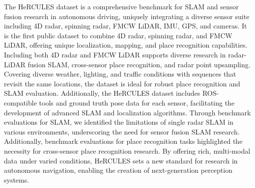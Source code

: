 The HeRCULES dataset is a comprehensive benchmark for \ac{SLAM} and sensor fusion research in autonomous driving, uniquely integrating a diverse sensor suite including 4D radar, spinning radar, \ac{FMCW} \ac{LiDAR}, \ac{IMU}, \ac{GPS}, and cameras. It is the first public dataset to combine 4D radar, spinning radar, and \ac{FMCW} \ac{LiDAR}, offering unique localization, mapping, and place recognition capabilities. Including both 4D radar and \ac{FMCW} \ac{LiDAR} supports diverse research in radar-\ac{LiDAR} fusion \ac{SLAM}, cross-sensor place recognition, and radar point upsampling. Covering diverse weather, lighting, and traffic conditions with sequences that revisit the same locations, the dataset is ideal for robust place recognition and \ac{SLAM} evaluation. Additionally, the HeRCULES dataset includes \ac{ROS}-compatible tools and ground truth pose data for each sensor, facilitating the development of advanced \ac{SLAM} and localization algorithms. Through benchmark evaluations for \ac{SLAM}, we identified the limitations of single radar \ac{SLAM} in various environments, underscoring the need for sensor fusion SLAM research. Additionally, benchmark evaluations for place recognition tasks highlighted the necessity for cross-sensor place recognition research. By offering rich, multi-modal data under varied conditions, HeRCULES sets a new standard for research in autonomous navigation, enabling the creation of next-generation perception systems.










\newpage